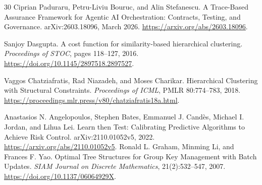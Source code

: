 \begin{thebibliography}{30}
 Ciprian Paduraru, Petru-Liviu Bouruc, and Alin Stefanescu.
\newblock A Trace-Based Assurance Framework for Agentic AI Orchestration: Contracts, Testing, and Governance.
\newblock arXiv:2603.18096, March 2026.
\newblock \url{https://arxiv.org/abs/2603.18096}.

 Sanjoy Dasgupta.
\newblock A cost function for similarity-based hierarchical clustering.
\newblock \emph{Proceedings of STOC}, pages 118--127, 2016.
\newblock \url{https://doi.org/10.1145/2897518.2897527}.

 Vaggos Chatziafratis, Rad Niazadeh, and Moses Charikar.
\newblock Hierarchical Clustering with Structural Constraints.
\newblock \emph{Proceedings of ICML}, PMLR 80:774--783, 2018.
\newblock \url{https://proceedings.mlr.press/v80/chatziafratis18a.html}.

 Anastasios N. Angelopoulos, Stephen Bates, Emmanuel J. Cand\`es,
Michael I. Jordan, and Lihua Lei.
\newblock Learn then Test: Calibrating Predictive Algorithms to Achieve Risk Control.
\newblock arXiv:2110.01052v5, 2022.
\newblock \url{https://arxiv.org/abs/2110.01052v5}.
 Ronald L. Graham, Minming Li, and Frances F. Yao.
\newblock Optimal Tree Structures for Group Key Management with Batch Updates.
\newblock \emph{SIAM Journal on Discrete Mathematics}, 21(2):532--547, 2007.
\newblock \url{https://doi.org/10.1137/06064929X}.
\end{thebibliography}
